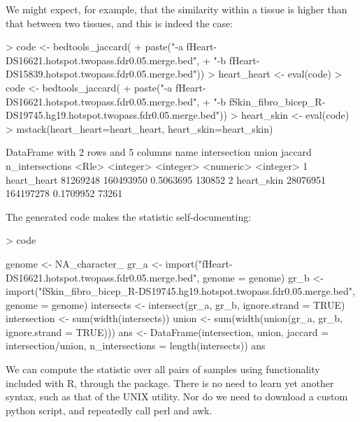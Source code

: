 \documentclass[10pt]{article}
\begin{document}
We might expect, for example, that the similarity within a tissue is
higher than that between two tissues, and this is indeed the case:
\begin{Schunk}
\begin{Sinput}
> code <- bedtools_jaccard(
+     paste("-a fHeart-DS16621.hotspot.twopass.fdr0.05.merge.bed",
+           "-b fHeart-DS15839.hotspot.twopass.fdr0.05.merge.bed"))
> heart_heart <- eval(code)
> code <- bedtools_jaccard(
+     paste("-a fHeart-DS16621.hotspot.twopass.fdr0.05.merge.bed",
+           "-b fSkin_fibro_bicep_R-DS19745.hg19.hotspot.twopass.fdr0.05.merge.bed"))
> heart_skin <- eval(code)
> mstack(heart_heart=heart_heart, heart_skin=heart_skin)
\end{Sinput}
\begin{Soutput}
DataFrame with 2 rows and 5 columns
         name intersection     union   jaccard n_intersections
        <Rle>    <integer> <integer> <numeric>       <integer>
1 heart_heart     81269248 160493950 0.5063695          130852
2  heart_skin     28076951 164197278 0.1709952           73261
\end{Soutput}
\end{Schunk}
%
The generated code makes the statistic self-documenting:
\begin{Schunk}
\begin{Sinput}
> code
\end{Sinput}
\begin{Soutput}
{
    genome <- NA_character_
    gr_a <- import("fHeart-DS16621.hotspot.twopass.fdr0.05.merge.bed", 
        genome = genome)
    gr_b <- import("fSkin_fibro_bicep_R-DS19745.hg19.hotspot.twopass.fdr0.05.merge.bed", 
        genome = genome)
    intersects <- intersect(gr_a, gr_b, ignore.strand = TRUE)
    intersection <- sum(width(intersects))
    union <- sum(width(union(gr_a, gr_b, ignore.strand = TRUE)))
    ans <- DataFrame(intersection, union, jaccard = intersection/union, 
        n_intersections = length(intersects))
    ans
}
\end{Soutput}
\end{Schunk}

We can compute the statistic over all pairs of samples using
functionality included with R, through the 
package. There is no need to learn yet another syntax, such as that of
the  UNIX utility. Nor do we need to download a
custom python script, and repeatedly call perl and awk.
\begin{Schunk}
\end{Schunk}
\end{document}
